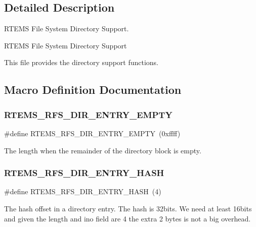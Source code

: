 \subsection{Detailed Description}
R\+T\+E\+MS File System Directory Support. 

R\+T\+E\+MS File System Directory Support

This file provides the directory support functions. 

\subsection{Macro Definition Documentation}
\mbox{\label{rtems-rfs-dir_8h_aa915855cc4cb98df4b2066beaa13030c}} 
\subsubsection{\texorpdfstring{RTEMS\_RFS\_DIR\_ENTRY\_EMPTY}{RTEMS\_RFS\_DIR\_ENTRY\_EMPTY}}
{\footnotesize\ttfamily \#define R\+T\+E\+M\+S\+\_\+\+R\+F\+S\+\_\+\+D\+I\+R\+\_\+\+E\+N\+T\+R\+Y\+\_\+\+E\+M\+P\+TY~(0xffff)}

The length when the remainder of the directory block is empty. \mbox{\label{rtems-rfs-dir_8h_a63fb1e0d701229800ef9f1206d8ac295}} 
\subsubsection{\texorpdfstring{RTEMS\_RFS\_DIR\_ENTRY\_HASH}{RTEMS\_RFS\_DIR\_ENTRY\_HASH}}
{\footnotesize\ttfamily \#define R\+T\+E\+M\+S\+\_\+\+R\+F\+S\+\_\+\+D\+I\+R\+\_\+\+E\+N\+T\+R\+Y\+\_\+\+H\+A\+SH~(4)}

The hash offset in a directory entry. The hash is 32bits. We need at least 16bits and given the length and ino field are 4 the extra 2 bytes is not a big overhead. \mbox{\label{rtems-rfs-dir_8h_af5bfaf8b9997cd44ca60fd1e2347c73b}} 
